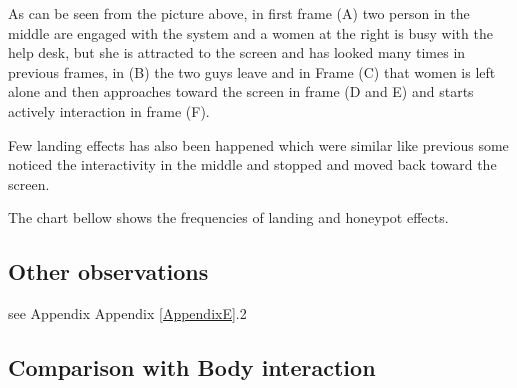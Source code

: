 As can be seen from the picture above, in first frame (A) two person in the middle are engaged with the system and a women at the right is busy with the help desk, but she is attracted to the screen and has looked many times in previous frames, in (B) the two guys leave and in Frame (C) that women is left alone and then approaches toward the screen in frame (D and E) and starts actively interaction in frame (F).

Few landing effects has also been happened which were similar like previous some noticed the interactivity in the middle and stopped and moved back toward the screen.  

The chart bellow shows the frequencies of landing and honeypot effects.

\begin{table}[H]
\caption{Landing and honeypot effects}
\label{tab:landingandhonypot}
\centering
{}
\end{table}







\subsection{Other observations}
see Appendix Appendix \ref{AppendixE}.2





\newpage
\subsection{Comparison with Body interaction}


